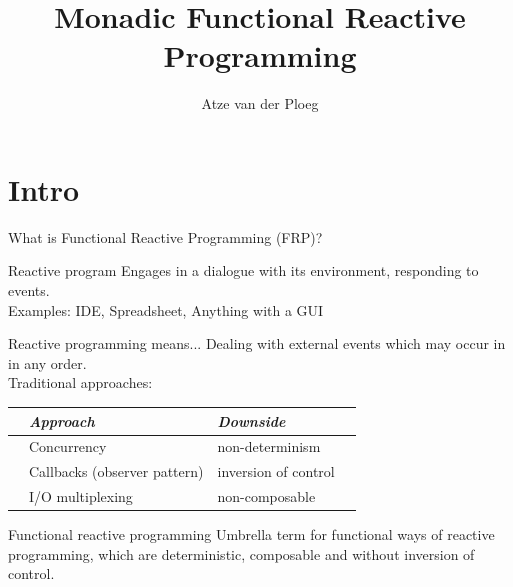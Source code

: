 \documentclass{beamer}
\title{Monadic Functional Reactive Programming}
\author{Atze van der Ploeg}
\institute{
Centrum Wiskunde \& Informatica, Amsterdam, The Netherlands}
\begin{document}



\begin{frame}
\begin{center}
  \scalebox{12}{$\bind$}
\end{center}
\vspace{-0.5cm}
  \titlepage
\end{frame}

\section{Intro}



\newcommand{\inlineitem}{%
{\color{navyblue} \leavevmode\usebeamertemplate{itemize item} }
}

\begin{frame}{What is Functional Reactive Programming (FRP)?}
\begin{block}{Reactive program}
Engages in a dialogue with its environment, responding to events.\\

Examples: IDE, Spreadsheet, Anything with a GUI
\end{block}
\begin{block}{Reactive programming means...}
Dealing with external events which may occur in \alert{in any order}.\\
\vspace{0.2cm}
Traditional approaches:\\
\begin{tabular}{l l l l}
  & \emph{Approach} & \emph{Downside}\\
\hline
\inlineitem & Concurrency & non-determinism\\
\inlineitem & Callbacks (observer pattern) & inversion of control \\
\inlineitem & I/O multiplexing & non-composable\\
\end{tabular}
\end{block}

\begin{block}{Functional reactive programming}
Umbrella term for functional ways of reactive programming, which are \alert{deterministic}, \alert{composable} and \alert{without inversion of control}.
\end{block}


\end{frame}
\end{document}
